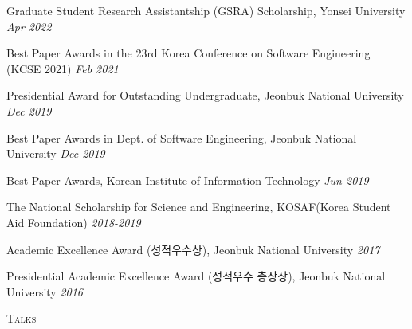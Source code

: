 \documentclass[10pt]{article}
\newenvironment{changemargin}[2]{
  \begin{list}{}{
    \setlength{\topsep}{0pt}
    \setlength{\leftmargin}{#1}
    \setlength{\rightmargin}{#2}
    \setlength{\listparindent}{\parindent}
    \setlength{\itemindent}{\parindent}
    \setlength{\parsep}{\parskip}
  }
  \item[]}{\end{list}
}
\newcommand{\lineover}{
	\begin{changemargin}{-0.05in}{-0.05in}
		\vspace*{-8pt}
		\hrulefill \\
		\vspace*{-2pt}
	\end{changemargin}
}
\newcommand{\header}[1]{
	\begin{changemargin}{-0.5in}{-0.5in}
		\scshape{#1}\\
  	\lineover
	\end{changemargin}
}
\newcommand{\award}[2]{
	{#1} \hfill \emph{#2}\\ \medskip
}
\newenvironment{body} {
	\vspace*{-16pt}
	\begin{changemargin}{-0.25in}{-0.5in}
  }
	{\end{changemargin}
}
\begin{document}
\begin{body}
\award{Graduate Student Research Assistantship (GSRA) Scholarship, Yonsei University}{Apr 2022}
\award{Best Paper Awards in the 23rd Korea Conference on Software Engineering (KCSE 2021)}{Feb 2021}
\award{Presidential Award for Outstanding Undergraduate, Jeonbuk National University}{Dec 2019}
\award{Best Paper Awards in Dept. of Software Engineering, Jeonbuk National University}{Dec 2019}
\award{Best Paper Awards, Korean Institute of Information Technology}{Jun 2019}
\award{The National Scholarship for Science and Engineering, KOSAF(Korea Student Aid Foundation)}{2018-2019}
\award{Academic Excellence Award (성적우수상), Jeonbuk National University} {2017}
\award{Presidential Academic Excellence Award (성적우수 총장상), Jeonbuk National University} {2016}
\end{body}

\medskip
\header{Talks}
\end{document}
